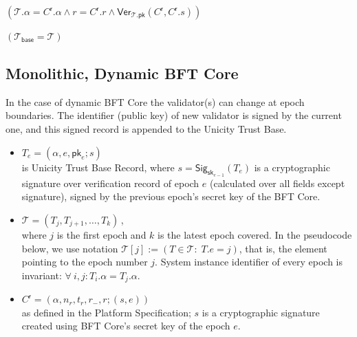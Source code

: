 \begin{algorithmic}[0]
    \State \Return $(\mathcal{T}.\alpha = C^\mathsf{r}.\alpha \land r = C^\mathsf{r}.r  \land \mathsf{Ver}_{\mathcal{T}.\mathsf{pk}}(C^\mathsf{r}, C^\mathsf{r}.s))$  
  \EndFunction
\end{algorithmic}

\begin{algorithmic}[0]
    \State \Return $(\mathcal{T}_\mathsf{base} = \mathcal{T})$  
  \EndFunction
\end{algorithmic}


\subsection{Monolithic, Dynamic BFT Core}\label{ch:m-rc}

In the case of dynamic BFT Core the validator(s) can change at epoch boundaries. The identifier (public key) of new validator is signed by the current one, and this signed record is appended to the Unicity Trust Base.

\begin{itemize}
  \item $T_e = (\alpha, e, \mathsf{pk}_e; s)$ \\
  is Unicity Trust Base Record, where $s = \mathsf{Sig}_{\mathsf{sk}_{e-1}}(T_e)$ is a cryptographic signature over verification record of epoch $e$ (calculated over all fields except signature), signed by the previous epoch's secret key of the BFT Core.
  \item $\mathcal{T} = (T_j, T_{j+1}, \ldots, T_k)$\,, \\
  where $j$ is the first epoch and $k$ is the latest epoch covered. In the pseudocode below, we use notation $\mathcal{T}[j] := (T \in \mathcal{T}\colon \; T.e = j )$, that is, the element pointing to the epoch number $j$. System instance identifier of every epoch is invariant: $\forall\ i, j \colon T_i.\alpha = T_j.\alpha$.
  \item $C^\mathsf{r} = (\alpha, n_r, t_r, r_-, r; (s, e))$  \\
  as defined in the Platform Specification; $s$ is a cryptographic signature created using BFT Core's secret key of the epoch $e$.
\end{itemize}

